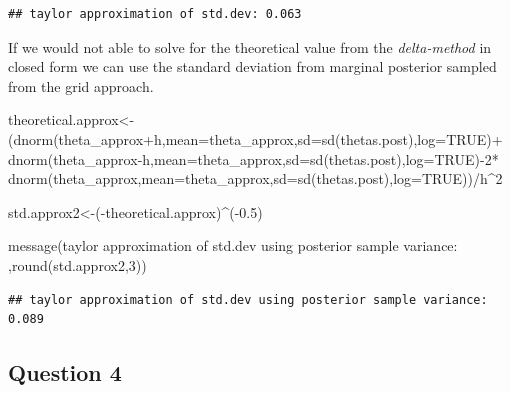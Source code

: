 \documentclass[
]{book}
\newenvironment{Shaded}{\begin{snugshade}}{\end{snugshade}}
\newcommand{\AttributeTok}[1]{\textcolor[rgb]{0.77,0.63,0.00}{#1}}
\newcommand{\ConstantTok}[1]{\textcolor[rgb]{0.00,0.00,0.00}{#1}}
\newcommand{\DecValTok}[1]{\textcolor[rgb]{0.00,0.00,0.81}{#1}}
\newcommand{\FloatTok}[1]{\textcolor[rgb]{0.00,0.00,0.81}{#1}}
\newcommand{\FunctionTok}[1]{\textcolor[rgb]{0.00,0.00,0.00}{#1}}
\newcommand{\NormalTok}[1]{#1}
\newcommand{\OtherTok}[1]{\textcolor[rgb]{0.56,0.35,0.01}{#1}}
\newcommand{\SpecialCharTok}[1]{\textcolor[rgb]{0.00,0.00,0.00}{#1}}
\newcommand{\StringTok}[1]{\textcolor[rgb]{0.31,0.60,0.02}{#1}}
\theoremstyle{definition}
\theoremstyle{definition}
\theoremstyle{definition}
\theoremstyle{definition}
\theoremstyle{remark}
\begin{document}
\begin{verbatim}
## taylor approximation of std.dev: 0.063
\end{verbatim}

If we would not able to solve for the theoretical value from the \emph{delta-method} in closed form we can use the standard deviation from marginal posterior sampled from the grid approach.

\begin{Shaded}
\begin{Highlighting}[]
\NormalTok{theoretical.approx}\OtherTok{\textless{}{-}}\NormalTok{(}\FunctionTok{dnorm}\NormalTok{(theta\_approx}\SpecialCharTok{+}\NormalTok{h,}\AttributeTok{mean=}\NormalTok{theta\_approx,}\AttributeTok{sd=}\FunctionTok{sd}\NormalTok{(thetas.post),}\AttributeTok{log=}\ConstantTok{TRUE}\NormalTok{)}\SpecialCharTok{+}  \FunctionTok{dnorm}\NormalTok{(theta\_approx}\SpecialCharTok{{-}}\NormalTok{h,}\AttributeTok{mean=}\NormalTok{theta\_approx,}\AttributeTok{sd=}\FunctionTok{sd}\NormalTok{(thetas.post),}\AttributeTok{log=}\ConstantTok{TRUE}\NormalTok{)}\SpecialCharTok{{-}}\DecValTok{2}\SpecialCharTok{*}  \FunctionTok{dnorm}\NormalTok{(theta\_approx,}\AttributeTok{mean=}\NormalTok{theta\_approx,}\AttributeTok{sd=}\FunctionTok{sd}\NormalTok{(thetas.post),}\AttributeTok{log=}\ConstantTok{TRUE}\NormalTok{))}\SpecialCharTok{/}\NormalTok{h}\SpecialCharTok{\^{}}\DecValTok{2}

\NormalTok{std.approx2}\OtherTok{\textless{}{-}}\NormalTok{(}\SpecialCharTok{{-}}\NormalTok{theoretical.approx)}\SpecialCharTok{\^{}}\NormalTok{(}\SpecialCharTok{{-}}\FloatTok{0.5}\NormalTok{)}

 \FunctionTok{message}\NormalTok{(}\StringTok{\textquotesingle{}taylor approximation of std.dev using posterior sample variance: \textquotesingle{}}\NormalTok{,}\FunctionTok{round}\NormalTok{(std.approx2,}\DecValTok{3}\NormalTok{))}
\end{Highlighting}
\end{Shaded}

\begin{verbatim}
## taylor approximation of std.dev using posterior sample variance: 0.089
\end{verbatim}

\hypertarget{question-4-1}{%
\subsection*{Question 4}\label{question-4-1}}
\end{document}
